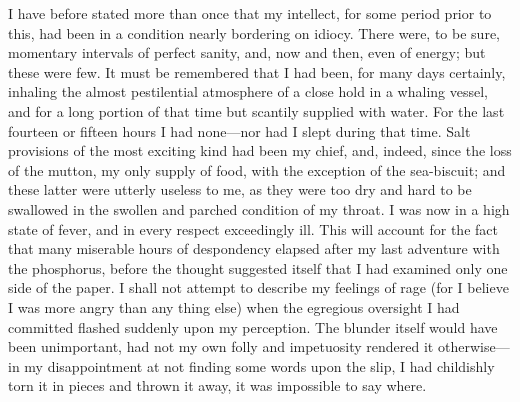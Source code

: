 I have before stated more than once that my intellect, for some period prior
to this, had been in a condition nearly bordering on idiocy. There were, to be
sure, momentary intervals of perfect sanity, and, now and then, even of energy;
but these were few. It must be remembered that I had been, for many days
certainly, inhaling the almost pestilential atmosphere of a close hold in a
whaling vessel, and for a long portion of that time but scantily supplied with
water. For the last fourteen or fifteen hours I had none---nor had I slept
during that time. Salt provisions of the most exciting kind had been my chief,
and, indeed, since the loss of the mutton, my only supply of food, with the
exception of the sea-biscuit; and these latter were utterly useless to me, as
they were too dry and hard to be swallowed in the swollen and parched condition
of my throat. I was now in a high state of fever, and in every respect
exceedingly ill. This will account for the fact that many miserable hours of
despondency elapsed after my last adventure with the phosphorus, before the
thought suggested itself that I had examined only one side of the paper. I shall
not attempt to describe my feelings of rage (for I believe I was more angry than
any thing else) when the egregious oversight I had committed flashed suddenly
upon my perception. The blunder itself would have been unimportant, had not my
own folly and impetuosity rendered it otherwise---in my disappointment at not
finding some words upon the slip, I had childishly torn it in pieces and thrown
it away, it was impossible to say where. 

